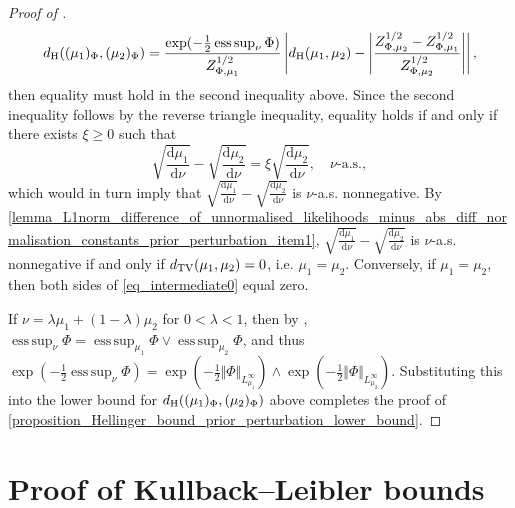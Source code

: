 \documentclass[a4paper]{scrartcl}
\theoremstyle{definition}
\numberwithin{equation}{section}
\newcommand{\rd}{\mathrm{d}}
\DeclareMathOperator*{\esssup}{ess\,sup}
\newcommand{\Abs}[1]{\left\vert#1\right\vert}
\newcommand{\norm}[1]{\Vert #1 \Vert}
\newcommand{\Hel}[0]{\textup{H}}
\newcommand{\TV}[0]{\textup{TV}}
\begin{document}
\begin{proof}[Proof of ]
\begin{equation}
 \label{eq_intermediate0}
  d_{\Hel}((\mu_1)_\Phi,(\mu_2)_\Phi)=\frac{\exp(-\tfrac{1}{2}\esssup_\nu\Phi)}{Z_{\Phi,\mu_1}^{1/2}}\Abs{d_{\Hel}(\mu_1,\mu_2)-\Abs{\frac{Z_{\Phi,\mu_2}^{1/2}-Z_{\Phi,\mu_1}^{1/2}}{Z_{\Phi,\mu_2}^{1/2} }}},
 \end{equation}
 then equality must hold in the second inequality above.
 Since the second inequality follows by the reverse triangle inequality, equality holds if and only if there exists $\xi\geq 0$ such that 
\begin{equation*}
 \sqrt{\frac{\rd\mu_1}{\rd\nu}}-\sqrt{\frac{\rd\mu_2}{\rd\nu}}=\xi \sqrt{\frac{\rd\mu_2}{\rd\nu}},\quad \text{$\nu$-a.s.},
\end{equation*}
 which would in turn imply that $\sqrt{\frac{\rd\mu_1}{\rd\nu}}-\sqrt{\frac{\rd\mu_2}{\rd\nu}}$ is $\nu$-a.s. nonnegative. 
 By \ref{lemma_L1norm_difference_of_unnormalised_likelihoods_minus_abs_diff_normalisation_constants_prior_perturbation_item1}, $\sqrt{\tfrac{\rd\mu_1}{\rd\nu}}-\sqrt{\tfrac{\rd\mu_2}{\rd\nu}}$ is $\nu$-a.s. nonnegative if and only if $d_{\TV}(\mu_1,\mu_2)=0$, i.e. $\mu_1=\mu_2$.
 Conversely, if $\mu_1=\mu_2$, then both sides of \eqref{eq_intermediate0} equal zero.
 
 If $\nu=\lambda \mu_1+(1-\lambda)\mu_2$ for $0<\lambda<1$, then by , $\esssup_\nu \Phi=\esssup_{\mu_1}\Phi \vee \esssup_{\mu_2}\Phi$, and thus $\exp(-\tfrac{1}{2}\esssup_\nu\Phi)=\exp(-\tfrac{1}{2}\norm{\Phi}_{L^\infty_{\mu_1}})\wedge \exp(-\tfrac{1}{2}\norm{\Phi}_{L^\infty_{\mu_2}})$.
 Substituting this into the lower bound for $d_{\Hel}((\mu_1)_\Phi,(\mu_2)_\Phi)$ above completes the proof of \cref{proposition_Hellinger_bound_prior_perturbation_lower_bound}.
\end{proof}

\section{Proof of Kullback--Leibler bounds}
\label{section_KLbounds_proofs}
\end{document}
